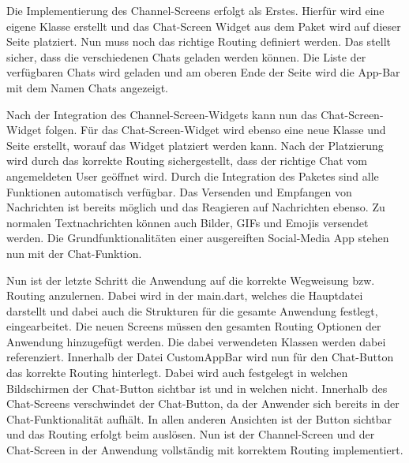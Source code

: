 \noindent
Die Implementierung des Channel-Screens erfolgt als Erstes. Hierfür wird eine eigene Klasse erstellt und das Chat-Screen Widget aus dem Paket wird auf dieser Seite platziert. Nun muss noch das richtige Routing definiert werden. Das stellt sicher, dass die verschiedenen Chats geladen werden können. Die Liste der verfügbaren Chats wird geladen und am oberen Ende der Seite wird die App-Bar mit dem Namen Chats angezeigt.

\noindent
Nach der Integration des Channel-Screen-Widgets kann nun das Chat-Screen-Widget folgen. Für das Chat-Screen-Widget wird ebenso eine neue Klasse und Seite erstellt, worauf das Widget platziert werden kann. Nach der Platzierung wird durch das korrekte Routing sichergestellt, dass der richtige Chat vom angemeldeten User geöffnet wird. Durch die Integration des Paketes sind alle Funktionen automatisch verfügbar. Das Versenden und Empfangen von Nachrichten ist bereits möglich und das Reagieren auf Nachrichten ebenso. Zu normalen Textnachrichten können auch Bilder, GIFs und Emojis versendet werden. Die Grundfunktionalitäten einer ausgereiften Social-Media App stehen nun mit der Chat-Funktion.

\noindent
Nun ist der letzte Schritt die Anwendung auf die korrekte Wegweisung bzw. Routing anzulernen. Dabei wird in der main.dart, welches die Hauptdatei darstellt und dabei auch die Strukturen für die gesamte Anwendung festlegt, eingearbeitet. Die neuen Screens müssen den gesamten Routing Optionen der Anwendung hinzugefügt werden. Die dabei verwendeten Klassen werden dabei referenziert. Innerhalb der Datei CustomAppBar wird nun für den Chat-Button das korrekte Routing hinterlegt. Dabei wird auch festgelegt in welchen Bildschirmen der Chat-Button sichtbar ist und in welchen nicht. Innerhalb des Chat-Screens verschwindet der Chat-Button, da der Anwender sich bereits in der Chat-Funktionalität aufhält. In allen anderen Ansichten ist der Button sichtbar und das Routing erfolgt beim auslösen. Nun ist der Channel-Screen und der Chat-Screen in der Anwendung vollständig mit korrektem Routing implementiert.